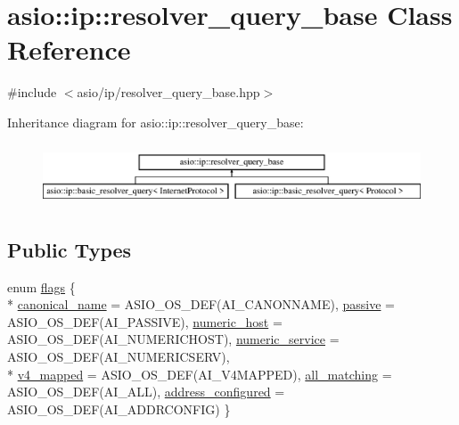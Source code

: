 \hypertarget{classasio_1_1ip_1_1resolver__query__base}{}\section{asio\+:\+:ip\+:\+:resolver\+\_\+query\+\_\+base Class Reference}
\label{classasio_1_1ip_1_1resolver__query__base}


{\ttfamily \#include $<$asio/ip/resolver\+\_\+query\+\_\+base.\+hpp$>$}

Inheritance diagram for asio\+:\+:ip\+:\+:resolver\+\_\+query\+\_\+base\+:\begin{figure}[H]
\begin{center}
\leavevmode
\includegraphics[height=1.860465cm]{classasio_1_1ip_1_1resolver__query__base}
\end{center}
\end{figure}
\subsection*{Public Types}
\begin{DoxyCompactItemize}
\item 
enum \hyperlink{classasio_1_1ip_1_1resolver__query__base_a458691242de07dc542fd9834f7b15cfe}{flags} \{ \\*
\hyperlink{classasio_1_1ip_1_1resolver__query__base_a458691242de07dc542fd9834f7b15cfea02d6078efc9d694dc98b8529d3649289}{canonical\+\_\+name} = A\+S\+I\+O\+\_\+\+O\+S\+\_\+\+D\+E\+F(A\+I\+\_\+\+C\+A\+N\+O\+N\+N\+A\+M\+E), 
\hyperlink{classasio_1_1ip_1_1resolver__query__base_a458691242de07dc542fd9834f7b15cfea2b72b18f2bf20dd05242e133e3a6cb79}{passive} = A\+S\+I\+O\+\_\+\+O\+S\+\_\+\+D\+E\+F(A\+I\+\_\+\+P\+A\+S\+S\+I\+V\+E), 
\hyperlink{classasio_1_1ip_1_1resolver__query__base_a458691242de07dc542fd9834f7b15cfea298ed0afafa60ec6218d6d9c8f227316}{numeric\+\_\+host} = A\+S\+I\+O\+\_\+\+O\+S\+\_\+\+D\+E\+F(A\+I\+\_\+\+N\+U\+M\+E\+R\+I\+C\+H\+O\+S\+T), 
\hyperlink{classasio_1_1ip_1_1resolver__query__base_a458691242de07dc542fd9834f7b15cfea7c911b858cf35654d565287b8ac8aa37}{numeric\+\_\+service} = A\+S\+I\+O\+\_\+\+O\+S\+\_\+\+D\+E\+F(A\+I\+\_\+\+N\+U\+M\+E\+R\+I\+C\+S\+E\+R\+V), 
\\*
\hyperlink{classasio_1_1ip_1_1resolver__query__base_a458691242de07dc542fd9834f7b15cfea7966b394def775a4131f53d90399b225}{v4\+\_\+mapped} = A\+S\+I\+O\+\_\+\+O\+S\+\_\+\+D\+E\+F(A\+I\+\_\+\+V4\+M\+A\+P\+P\+E\+D), 
\hyperlink{classasio_1_1ip_1_1resolver__query__base_a458691242de07dc542fd9834f7b15cfea9b8576dd131d1c201a1f97f38d4e24b9}{all\+\_\+matching} = A\+S\+I\+O\+\_\+\+O\+S\+\_\+\+D\+E\+F(A\+I\+\_\+\+A\+L\+L), 
\hyperlink{classasio_1_1ip_1_1resolver__query__base_a458691242de07dc542fd9834f7b15cfea72387a0c1a4eec494d376e28fefa7b8d}{address\+\_\+configured} = A\+S\+I\+O\+\_\+\+O\+S\+\_\+\+D\+E\+F(A\+I\+\_\+\+A\+D\+D\+R\+C\+O\+N\+F\+I\+G)
 \}
\end{DoxyCompactItemize}
